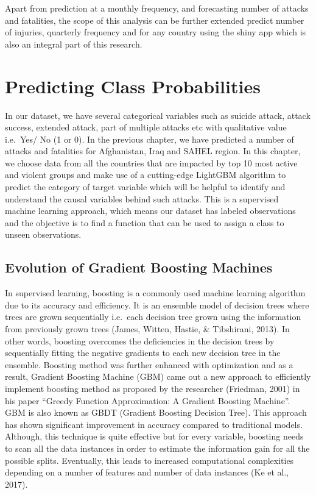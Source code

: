 \documentclass[11pt,oneside,a4paper]{reedthesis}
\begin{document}
Apart from prediction at a monthly frequency, and forecasting number of
attacks and fatalities, the scope of this analysis can be further
extended predict number of injuries, quarterly frequency and for any
country using the shiny app which is also an integral part of this
research.

\chapter{Predicting Class Probabilities}\label{classification}

In our dataset, we have several categorical variables such as suicide
attack, attack success, extended attack, part of multiple attacks etc
with qualitative value i.e.~Yes/ No (1 or 0). In the previous chapter,
we have predicted a number of attacks and fatalities for Afghanistan,
Iraq and SAHEL region. In this chapter, we choose data from all the
countries that are impacted by top 10 most active and violent groups and
make use of a cutting-edge LightGBM algorithm to predict the category of
target variable which will be helpful to identify and understand the
causal variables behind such attacks. This is a supervised machine
learning approach, which means our dataset has labeled observations and
the objective is to find a function that can be used to assign a class
to unseen observations.

\section{Evolution of Gradient Boosting
Machines}\label{evolution-of-gradient-boosting-machines}

In supervised learning, boosting is a commonly used machine learning
algorithm due to its accuracy and efficiency. It is an ensemble model of
decision trees where trees are grown sequentially i.e.~each decision
tree grown using the information from previously grown trees (James,
Witten, Hastie, \& Tibshirani, 2013). In other words, boosting overcomes
the deficiencies in the decision trees by sequentially fitting the
negative gradients to each new decision tree in the ensemble. Boosting
method was further enhanced with optimization and as a result, Gradient
Boosting Machine (GBM) came out a new approach to efficiently implement
boosting method as proposed by the researcher (Friedman, 2001) in his
paper ``Greedy Function Approximation: A Gradient Boosting Machine''.
GBM is also known as GBDT (Gradient Boosting Decision Tree). This
approach has shown significant improvement in accuracy compared to
traditional models. Although, this technique is quite effective but for
every variable, boosting needs to scan all the data instances in order
to estimate the information gain for all the possible splits.
Eventually, this leads to increased computational complexities depending
on a number of features and number of data instances (Ke et al., 2017).
\end{document}
